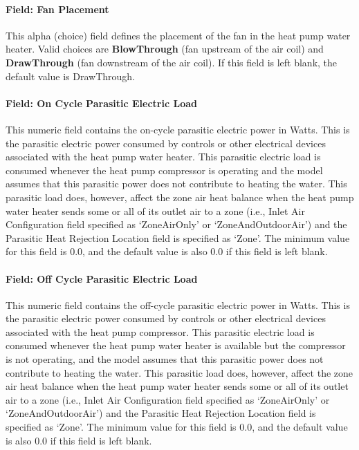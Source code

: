 \paragraph{Field: Fan Placement}\label{field-fan-placement-1-000}

This alpha (choice) field defines the placement of the fan in the heat pump water heater. Valid choices are \textbf{BlowThrough} (fan upstream of the air coil) and \textbf{DrawThrough} (fan downstream of the air coil). If this field is left blank, the default value is DrawThrough.

\paragraph{Field: On Cycle Parasitic Electric Load}\label{field-on-cycle-parasitic-electric-load-1}

This numeric field contains the on-cycle parasitic electric power in Watts. This is the parasitic electric power consumed by controls or other electrical devices associated with the heat pump water heater. This parasitic electric load is consumed whenever the heat pump compressor is operating and the model assumes that this parasitic power does not contribute to heating the water. This parasitic load does, however, affect the zone air heat balance when the heat pump water heater sends some or all of its outlet air to a zone (i.e., Inlet Air Configuration field specified as `ZoneAirOnly' or `ZoneAndOutdoorAir') and the Parasitic Heat Rejection Location field is specified as `Zone'. The minimum value for this field is 0.0, and the default value is also 0.0 if this field is left blank.

\paragraph{Field: Off Cycle Parasitic Electric Load}\label{field-off-cycle-parasitic-electric-load-1}

This numeric field contains the off-cycle parasitic electric power in Watts. This is the parasitic electric power consumed by controls or other electrical devices associated with the heat pump compressor. This parasitic electric load is consumed whenever the heat pump water heater is available but the compressor is not operating, and the model assumes that this parasitic power does not contribute to heating the water. This parasitic load does, however, affect the zone air heat balance when the heat pump water heater sends some or all of its outlet air to a zone (i.e., Inlet Air Configuration field specified as `ZoneAirOnly' or `ZoneAndOutdoorAir') and the Parasitic Heat Rejection Location field is specified as `Zone'. The minimum value for this field is 0.0, and the default value is also 0.0 if this field is left blank.

